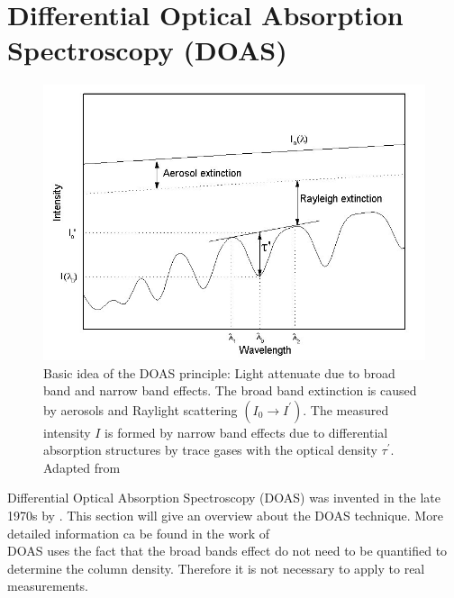 \documentclass  [
  paper    = a4,
  BCOR     = 10mm,
  twoside,
  fontsize = 12pt,
  fleqn,
  toc      = bibnumbered,
  toc      = listofnumbered,
  numbers  = noendperiod,
  headings = normal,
  listof   = leveldown,
  version  = 3.03
]                                       {scrreprt}
\begin{document}
	\section{Differential Optical Absorption Spectroscopy (DOAS)\label{DOAS}}
		\begin{figure}[h]
			\centering
			\includegraphics[width=0.8\linewidth]{Bilder/Simon/Bilder_Tung/DOAS_Intensity}
			\caption{Basic idea of the DOAS principle: Light attenuate due to broad band and narrow band effects. The broad band extinction is caused by aerosols and Raylight scattering $\left(I_0\rightarrow I^{'}\right)$. The measured intensity $I$ is formed by narrow band effects due to differential absorption structures by trace gases with the optical density $\tau^{'}$. Adapted from \cite{kern2009spectroscopic}}
			\label{fig:doasintensity}
		\end{figure}
	Differential Optical Absorption Spectroscopy (DOAS) was invented in the late 1970s by \cite{perner1979detection}. This section will give an overview about the DOAS technique. More detailed information ca be found in the work of \cite{platt2008differential}\\
	DOAS uses the fact that the broad bands effect do not need to be quantified to determine the column density.
	Therefore it is not necessary to apply  to real measurements.\\
	\newline
\end{document}
